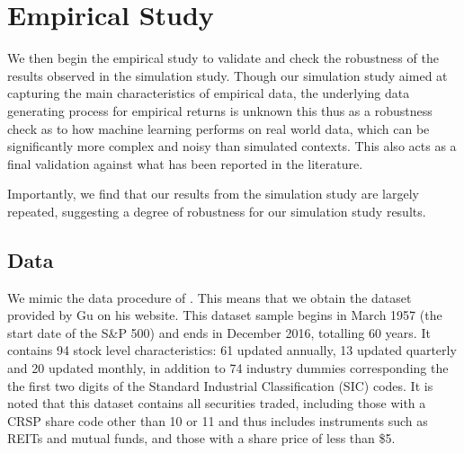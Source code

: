 \documentclass[11pt, a4paper, table]{article}
\begin{document}

\newpage

\section{Empirical Study}

We then begin the empirical study to validate and check the robustness of the results observed in the simulation study. Though our simulation study aimed at capturing the main characteristics of empirical data, the underlying data generating process for empirical returns is unknown this thus as a robustness check as to how machine learning performs on real world data, which can be significantly more complex and noisy than simulated contexts. This also acts as a final validation against what has been reported in the literature.

Importantly, we find that our results from the simulation study are largely repeated, suggesting a degree of robustness for our simulation study results.

\subsection{Data}

We mimic the data procedure of \cite{gu_empirical_2018}. This means that we obtain the dataset provided by Gu on his website. This dataset sample begins in March 1957 (the start date of the S\&P 500) and ends in December 2016, totalling 60 years. It contains 94 stock level characteristics: 61 updated annually, 13 updated quarterly and 20 updated monthly, in addition to 74 industry dummies corresponding the the first two digits of the Standard Industrial Classification (SIC) codes. It is noted that this dataset contains all securities traded, including those with a CRSP share code other than 10 or 11 and thus includes instruments such as REITs and mutual funds, and those with a share price of less than \$5.

\end{document}
